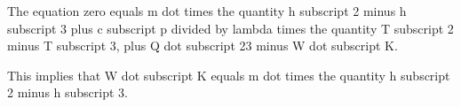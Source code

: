 The equation zero equals m dot times the quantity h subscript 2 minus h subscript 3 plus c subscript p divided by lambda times the quantity T subscript 2 minus T subscript 3, plus Q dot subscript 23 minus W dot subscript K.

This implies that W dot subscript K equals m dot times the quantity h subscript 2 minus h subscript 3.